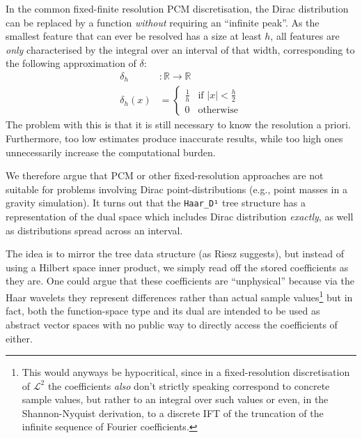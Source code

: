 \documentclass[final,sigplan,review,anonymous]{acmart}\settopmatter{printfolios=true,printccs=false,printacmref=false}
\theoremstyle{acmplain}
\theoremstyle{acmdefinition}
\begin{document}
In the common fixed-finite resolution PCM discretisation, the Dirac distribution can be replaced by a function \emph{without} requiring an “infinite peak”.
As the smallest feature that can ever be resolved has a size at least $h$,
all features are \emph{only} characterised by the integral over an interval of that width,
corresponding to the following approximation of $\delta$:
\begin{align*}
  \delta_h &\colon \mathbb{R} \to \mathbb{R}
 \\
  \delta_h(x) &= \begin{cases} \frac1h & \text{if }|x|<\tfrac{h}2
                          \\ 0         & \text{otherwise} \end{cases}
\end{align*}
The problem with this is that it is still necessary to know the resolution a priori.
Furthermore, too low estimates produce inaccurate results,
while too high ones unnecessarily increase the computational burden.

We therefore argue that PCM or other fixed-resolution approaches are not suitable for problems involving Dirac point-distributions (e.g., point masses in a gravity simulation).
It turns out that the \lstinline`Haar_D¹` tree structure has a representation of the dual space which includes Dirac distribution \emph{exactly},
as well as distributions spread across an interval.

The idea is to mirror the tree data structure (as Riesz suggests),
but instead of using a Hilbert space inner product,
we simply read off the stored coefficients as they are.
One could argue that these coefficients are “unphysical” because via the Haar wavelets they represent differences rather than actual sample values\footnote{%
This would anyways be hypocritical, since in a fixed-resolution discretisation of $\mathcal{L}^2$ the coefficients \emph{also} don't strictly speaking correspond to concrete sample values, but rather to an integral over such values or even, in the Shannon-Nyquist derivation, to a discrete IFT of the truncation of the infinite sequence of Fourier coefficients.
} but in fact, both the function-space type and its dual are intended to be used as abstract vector spaces with no public way to directly access the coefficients of either.
\end{document}
